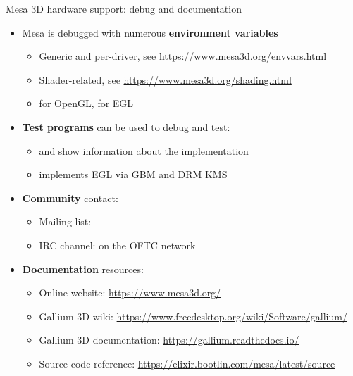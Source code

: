 \begin{frame}[fragile]{Mesa 3D hardware support: debug and documentation}
  \begin{itemize}
  \item Mesa is debugged with numerous \textbf{environment variables}
    \begin{itemize}
    \item Generic and per-driver, see \url{https://www.mesa3d.org/envvars.html}
    \item Shader-related, see \url{https://www.mesa3d.org/shading.html}
    \item {} for OpenGL,  for EGL
    \end{itemize}
  \item \textbf{Test programs} can be used to debug and test:
    \begin{itemize}
    \item {} and  show information about the implementation
    \item {} implements EGL via GBM and DRM KMS
    \end{itemize}
  \item \textbf{Community} contact:
    \begin{itemize}
    \item Mailing list: 
    \item IRC channel:  on the OFTC network
    \end{itemize}
  \item \textbf{Documentation} resources:
    \begin{itemize}
    \item Online website: \url{https://www.mesa3d.org/}
    \item Gallium 3D wiki: \url{https://www.freedesktop.org/wiki/Software/gallium/}
    \item Gallium 3D documentation: \url{https://gallium.readthedocs.io/}
    \item Source code reference: \url{https://elixir.bootlin.com/mesa/latest/source}
    \end{itemize}
  \end{itemize}
\end{frame}

